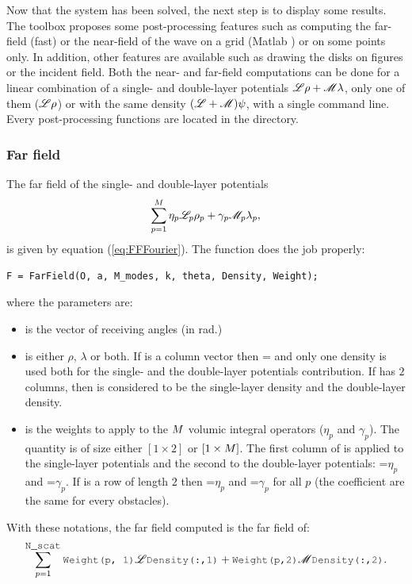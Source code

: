 Now that the system has been solved, the next step is to display some results. The \mudiff toolbox proposes some post-processing features such as computing the far-field (fast) or the near-field of the wave on a grid (Matlab ) or on some points only. In addition, other features are available such as drawing the disks on figures or the incident field. Both the near- and far-field computations can be done for a linear combination of a single- and double-layer potentials ${\mathscr L}\rho + {\mathscr M}\lambda$, only one of them (\eg ${\mathscr L}\rho$) or with the same density $({\mathscr L}+{\mathscr M})\psi$, with a single command line. Every post-processing functions are located in the  directory.

\subsubsection{Far field}
\label{secFun:FarField}
\label{secFun:FarFieldSingleLayer}
\label{secFun:FarFieldDoublleLayer}

The far field of the single- and double-layer potentials
$$
\sum_{p=1}^{M}\eta_p{\mathscr L}_p\rho_p + \gamma_p{\mathscr M}_p\lambda_p,
$$
is given by equation (\ref{eq:FFFourier}). The \FarField function does the job properly:
\begin{lstlisting}
F = FarField(O, a, M_modes, k, theta, Density, Weight);
\end{lstlisting}
where the parameters are:
\begin{itemize}
\item {} is the vector of receiving angles (in rad.)
\item {} is either $\rho$, $\lambda$ or both. If  is a column vector then  =  and only one density is used both for the single- and the double-layer potentials contribution. If  has $2$ columns, then  is considered to be the single-layer density and  the double-layer density.
\item {} is the weights to apply to the $M$ volumic integral operators ($\eta_p$ and $\gamma_p$). The quantity  is of size either $[1\times2]$ or $[1\times M]$. The first column of  is applied to the single-layer potentials and the second to the double-layer potentials: =$\eta_p$ and =$\gamma_p$. If  is a row of length $2$ then =$\eta_p$ and =$\gamma_p$ for all $p$ (the coefficient are the same for every obstacles).
\end{itemize}
With these notations, the far field computed is the far field of:
$$
\sum_{p=1}^{\code{N\_scat}}\code{Weight(p, 1)}\Lop\code{Density(:,1)} + \code{Weight(p,2)}\Mop\code{Density(:,2)}.
$$
